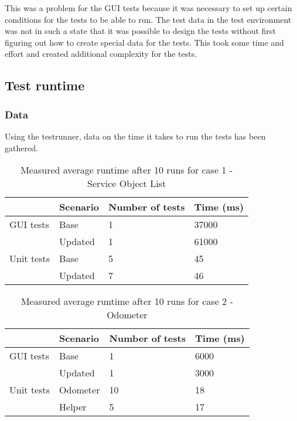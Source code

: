 \documentclass{article}
\begin{document}
 			 This was a problem for the GUI tests because it was necessary to set up certain conditions for the tests to be able to run. The test data in the test environment was not in such a state that it was possible to design the tests without first figuring out how to create special data for the tests. This took some time and effort and created additional complexity for the tests. 


		\subsection{Test runtime}

			\subsubsection{Data}
			Using the testrunner, data on the time it takes to run the tests has been gathered. 

			\begin{table}[h!]
				\begin{tabular}{l |l |l l}
				        & Scenario & Number of tests & Time (ms)\\
				\hline
				 GUI tests & Base     & 1               & 37000 \\
				        & Updated  & 1    			 & 61000 \\
				\hline
				 Unit tests & Base     & 5               & 45 \\
				 		& Updated  & 7               & 46 \\
				 \end{tabular}
				 \caption{Measured average runtime after 10 runs for case 1 - Service Object List}
			 \end{table}


			\begin{table}[h!]
				\begin{tabular}{l |l |l l}
				        & Scenario & Number of tests & Time (ms)\\
				\hline
				GUI tests & Base     & 1           & 6000 \\
				           & Updated  & 1    		& 3000 \\
				\hline
				Unit tests & Odometer & 10         & 18 \\
				 		& Helper      & 5           & 17 \\
				\end{tabular}
				\caption{Measured average runtime after 10 runs for case 2 - Odometer}
			\end{table}
\end{document}
